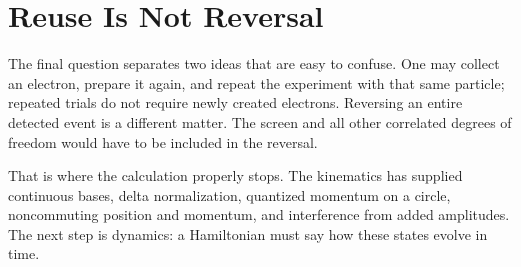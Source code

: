 \section{Reuse Is Not Reversal}

The final question separates two ideas that are easy to confuse. One may
collect an electron, prepare it again, and repeat the experiment with that
same particle; repeated trials do not require newly created electrons.
Reversing an entire detected event is a different matter. The screen and all
other correlated degrees of freedom would have to be included in the
reversal.

\begin{classroomqa}
\end{classroomqa}

That is where the calculation properly stops. The kinematics has supplied
continuous bases, delta normalization, quantized momentum on a circle,
noncommuting position and momentum, and interference from added amplitudes.
The next step is dynamics: a Hamiltonian must say how these states evolve in
time.
